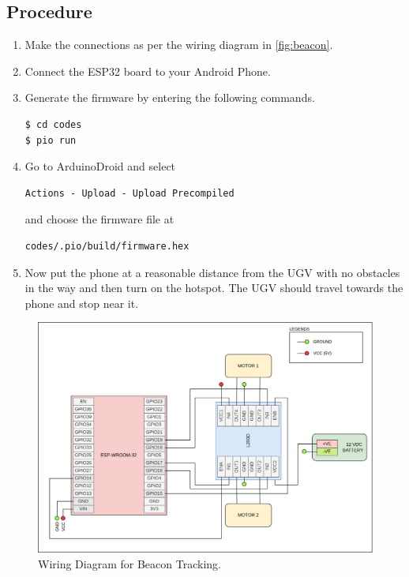 \documentclass[conference]{IEEEtran}
\begin{document}
\subsection{Procedure}
\begin{enumerate}
    \item Make the connections as per the wiring diagram in
    \autoref{fig:beacon}.
    \item Connect the ESP32 board to your Android Phone.
    \item Generate the firmware by entering the following commands.
        \begin{lstlisting}
$ cd codes
$ pio run
        \end{lstlisting}
    \item Go to ArduinoDroid and select
        \begin{lstlisting}
Actions - Upload - Upload Precompiled
        \end{lstlisting}
    and choose the firmware file at
        \begin{lstlisting}
codes/.pio/build/firmware.hex
        \end{lstlisting}
    \item Now put the phone at a reasonable distance from the UGV with no
    obstacles in the way and then turn on the hotspot. The UGV should travel
    towards the phone and stop near it.
\end{enumerate}

\begin{figure}[t]
    \centering
    \includegraphics[width=\columnwidth]{figs/beacon.png}
    \caption{Wiring Diagram for Beacon Tracking.}
    \label{fig:beacon}
\end{figure}
\end{document}
